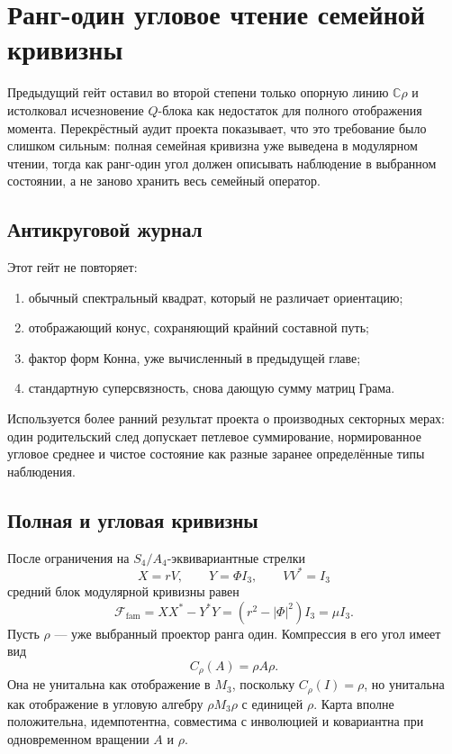 \chapter{Ранг-один угловое чтение семейной кривизны}

Предыдущий гейт оставил во второй степени только опорную линию
\(\mathbb C\rho\) и истолковал исчезновение \(Q\)-блока как недостаток для
полного отображения момента. Перекрёстный аудит проекта показывает, что это
требование было слишком сильным: полная семейная кривизна уже выведена в
модулярном чтении, тогда как ранг-один угол должен описывать наблюдение в
выбранном состоянии, а не заново хранить весь семейный оператор.

\section{Антикруговой журнал}

Этот гейт не повторяет:
\begin{enumerate}
 \item обычный спектральный квадрат, который не различает ориентацию;
 \item отображающий конус, сохраняющий крайний составной путь;
 \item фактор форм Конна, уже вычисленный в предыдущей главе;
 \item стандартную суперсвязность, снова дающую сумму матриц Грама.
\end{enumerate}
Используется более ранний результат проекта о производных секторных мерах:
один родительский след допускает петлевое суммирование, нормированное
угловое среднее и чистое состояние как разные заранее определённые типы
наблюдения.

\section{Полная и угловая кривизны}

После ограничения на \(S_4/A_4\)-эквивариантные стрелки
\begin{equation}
 X=rV,\qquad Y=\Phi I_3,\qquad VV^*=I_3
\end{equation}
средний блок модулярной кривизны равен
\begin{equation}
 \mathcal F_{\mathrm{fam}}
 =XX^*-Y^*Y
 =(r^2-|\Phi|^2)I_3
 =\mu I_3.
 \label{eq:v5-full-equivariant-moment}
\end{equation}
Пусть \(\rho\) --- уже выбранный проектор ранга один. Компрессия в его угол
имеет вид
\begin{equation}
 C_\rho(A)=\rho A\rho.
 \label{eq:v5-state-corner-compression}
\end{equation}
Она не унитальна как отображение в \(M_3\), поскольку \(C_\rho(I)=\rho\),
но унитальна как отображение в угловую алгебру \(\rho M_3\rho\) с единицей
\(\rho\). Карта вполне положительна, идемпотентна, совместима с инволюцией
и ковариантна при одновременном вращении \(A\) и \(\rho\).

